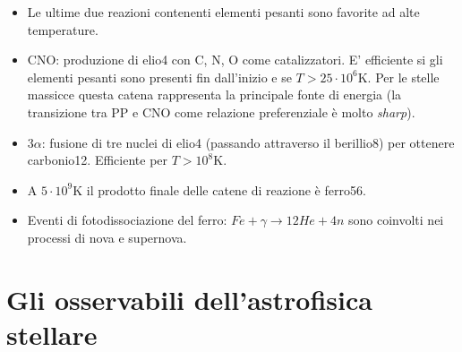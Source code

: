 \documentclass[11pt,a4paper]{article}
\begin{document}
\begin{itemize}
\item Le ultime due reazioni contenenti elementi pesanti sono favorite ad alte temperature.

\item CNO: produzione di elio4 con C, N, O come catalizzatori. E' efficiente si gli elementi pesanti sono presenti fin dall'inizio e se $T > 25 \cdot 10^6 \si{\K}$. Per le stelle massicce questa catena rappresenta la principale fonte di energia (la transizione tra PP e CNO come relazione preferenziale è molto \textit{sharp}).

\item 3$\alpha$: fusione di tre nuclei di elio4 (passando attraverso il berillio8) per ottenere carbonio12. Efficiente per $T>10^8 \si{\K}$.

\item A $5 \cdot 10^9 \si{\K}$ il prodotto finale delle catene di reazione è ferro56.

\item Eventi di fotodissociazione del ferro: $Fe + \gamma \rightarrow 12He + 4n$ sono coinvolti nei processi di nova e supernova.

\end{itemize}

\section{Gli osservabili dell'astrofisica stellare}
\end{document}
